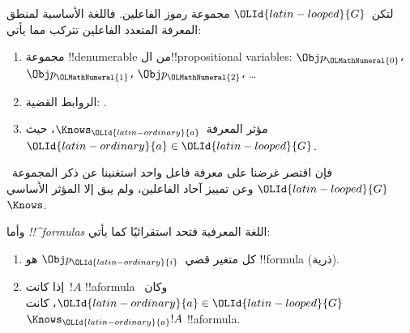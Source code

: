 \documentclass[../../../include/open-logic-section]{subfiles}
\begin{document}


\begin{defn}
لتكن~${\OLId{latin-looped}{G}}$ مجموعة رموز الفاعلين. فاللغة الأساسية لمنطق المعرفة المتعدد
الفاعلين تتركب مما يأتي:
\begin{enumerate}
  \item مجموعة !!{denumerable} من ال!!{propositional variable}s:
    $\Obj p_{\OLMathNumeral{0}}$، $\Obj p_{\OLMathNumeral{1}}$، $\Obj p_{\OLMathNumeral{2}}$، \dots
  \item الروابط القضية: \startycommalist
  .
  \item مؤثر المعرفة~$\Knows_{\OLId{latin-ordinary}{a}}$، حيث~${\OLId{latin-ordinary}{a}} \in {\OLId{latin-looped}{G}}$.
\end{enumerate}
\end{defn}

فإن اقتصر غرضنا على معرفة فاعل واحد استغنينا عن ذكر المجموعة~${\OLId{latin-looped}{G}}$ وعن
تمييز آحاد الفاعلين، ولم يبق إلا المؤثر الأساسي~$\Knows$.

\begin{defn}
وأما \emph{!!^{formula}s} اللغة المعرفية فتحد استقرائيًا كما يأتي:
\begin{enumerate}


\item كل متغير قضي~$\Obj p_{\OLId{latin-ordinary}{i}}$ هو !!{formula} (ذرية).






\item إذا كانت~$!A$ !!a{formula} وكان~${\OLId{latin-ordinary}{a}} \in {\OLId{latin-looped}{G}}$، كانت~$\Knows_{\OLId{latin-ordinary}{a}} !A$
  !!a{formula}.

\end{enumerate}
\end{defn}
\end{document}
